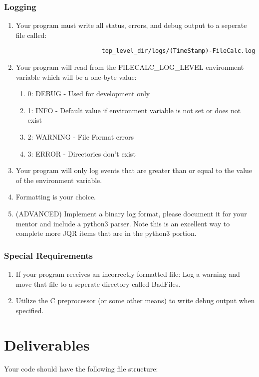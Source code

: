 \documentclass[letterpaper,12pt]{article}
\begin{document}
	\subsubsection{Logging}
		\begin{enumerate}
			\item Your program must write all status, errors, and debug output to a seperate file called:
			\begin{lstlisting}
						top_level_dir/logs/(TimeStamp)-FileCalc.log
			\end{lstlisting}
			\item Your program will read from the FILECALC\_LOG\_LEVEL environment variable which will be a one-byte value:
			\begin{enumerate}
				\item 0: DEBUG - Used for development only
				\item 1: INFO - Default value if environment variable is not set or does not exist
				\item 2: WARNING - File Format errors
				\item 3: ERROR - Directories don't exist
			\end{enumerate}
			\item Your program will only log events that are greater than or equal to the value of the environment variable.
			\item Formatting is your choice.
			\item (ADVANCED) Implement a binary log format, please document it for your mentor and include a python3 parser. Note this is an excellent way to complete more JQR items that are in the python3 portion.

		\end{enumerate}
	\subsubsection{Special Requirements}
		\begin{enumerate}
			\item If your program receives an incorrectly formatted file: Log a warning and move that file to a seperate directory called BadFiles.
			\item Utilize the C preprocessor (or some other means) to write debug output when specified.
		\end{enumerate}
	\section{Deliverables}
	Your code should have the following file structure:
	\hfill
\end{document}
